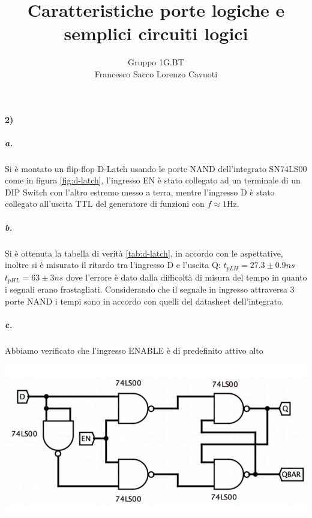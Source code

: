 \documentclass{article}
\date{}
\author{Gruppo 1G.BT \\ Francesco Sacco Lorenzo Cavuoti}
\title{Caratteristiche porte logiche e semplici circuiti logici}
\begin{document}
\maketitle
\paragraph{2)}
	\subparagraph{a.} Si è montato un flip-flop D-Latch usando le porte NAND dell'integrato SN74LS00 come in figura \ref{fig:d-latch}, l'ingresso EN è stato collegato ad un terminale di un DIP Switch con l'altro estremo messo a terra, mentre l'ingresso D è stato collegato all'uscita TTL del generatore di funzioni con $f\approx1$Hz.
	\subparagraph{b.} Si è ottenuta la tabella di verità \ref{tab:d-latch}, in accordo con le aspettative, inoltre si è misurato il ritardo tra l'ingresso D e l'uscita Q: $t_{pLH}=27.3\pm0.9 ns$ $t_{pHL}=63\pm3 ns$ dove l'errore è dato dalla difficoltà di misura del tempo in quanto i segnali erano frastagliati. Considerando che il segnale in ingresso attraversa 3 porte NAND i tempi sono in accordo con quelli del datasheet dell'integrato.
	\subparagraph{c.} Abbiamo verificato che l'ingresso ENABLE è di predefinito attivo alto\newline
	
	\begin{minipage}{.6\linewidth}
		\centering
		\includegraphics[width=\linewidth]{immagini/dlach}
		\label{fig:d-latch}
	\end{minipage}
	\begin{minipage}{.4\linewidth}
		
		\label{tab:d-latch}
	\end{minipage}\newline
\end{document}
